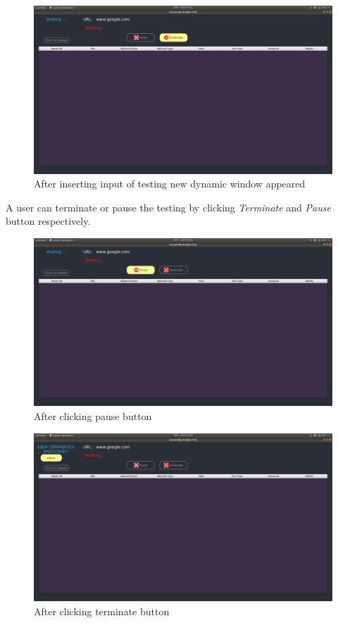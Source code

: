 \begin{figure}[h]
    \centering
    \includegraphics[width=\textwidth]{usersite/11waiting.png}
    \caption{After inserting input of testing new dynamic window appeared}
    \label{fig:user11}
\end{figure}

A user can terminate or pause the testing by clicking \emph{Terminate} and \emph{Pause} button respectively.
\begin{figure}[h]
    \centering
    \includegraphics[width=\textwidth]{usersite/12pause.png}
    \caption{After clicking pause button}
    \label{fig:user12}
\end{figure}

\begin{figure}[h]
    \centering
    \includegraphics[width=\textwidth]{usersite/13paused.png}
    \caption{After clicking terminate button}
    \label{fig:user13}
\end{figure}

